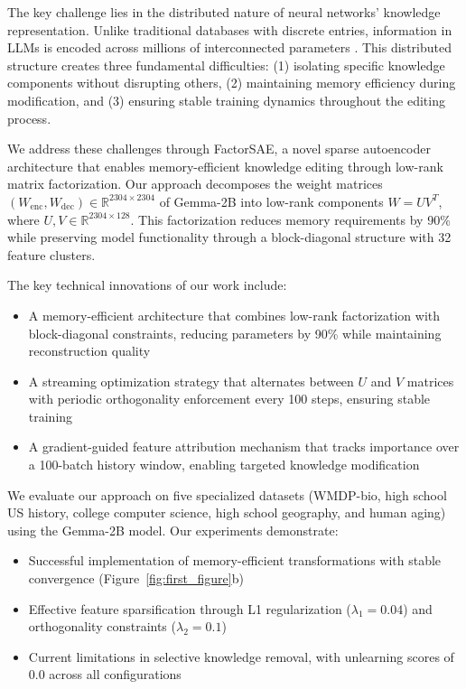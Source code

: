 \documentclass{article} %
\begin{document}
The key challenge lies in the distributed nature of neural networks' knowledge representation. Unlike traditional databases with discrete entries, information in LLMs is encoded across millions of interconnected parameters \cite{vaswani2017attention}. This distributed structure creates three fundamental difficulties: (1) isolating specific knowledge components without disrupting others, (2) maintaining memory efficiency during modification, and (3) ensuring stable training dynamics throughout the editing process.

We address these challenges through FactorSAE, a novel sparse autoencoder architecture that enables memory-efficient knowledge editing through low-rank matrix factorization. Our approach decomposes the weight matrices $(W_{\text{enc}}, W_{\text{dec}}) \in \mathbb{R}^{2304 \times 2304}$ of Gemma-2B into low-rank components $W = UV^T$, where $U, V \in \mathbb{R}^{2304 \times 128}$. This factorization reduces memory requirements by 90\% while preserving model functionality through a block-diagonal structure with 32 feature clusters.

The key technical innovations of our work include:
\begin{itemize}
    \item A memory-efficient architecture that combines low-rank factorization with block-diagonal constraints, reducing parameters by 90\% while maintaining reconstruction quality
    \item A streaming optimization strategy that alternates between $U$ and $V$ matrices with periodic orthogonality enforcement every 100 steps, ensuring stable training
    \item A gradient-guided feature attribution mechanism that tracks importance over a 100-batch history window, enabling targeted knowledge modification
\end{itemize}

We evaluate our approach on five specialized datasets (WMDP-bio, high school US history, college computer science, high school geography, and human aging) using the Gemma-2B model. Our experiments demonstrate:
\begin{itemize}
    \item Successful implementation of memory-efficient transformations with stable convergence (Figure~\ref{fig:first_figure}b)
    \item Effective feature sparsification through L1 regularization ($\lambda_1 = 0.04$) and orthogonality constraints ($\lambda_2 = 0.1$)
    \item Current limitations in selective knowledge removal, with unlearning scores of 0.0 across all configurations
\end{itemize}
\end{document}
